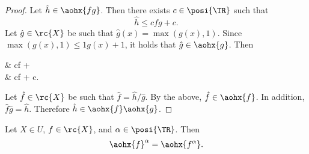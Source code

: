 \documentclass[b5paper, english, oneside]{memoir}
\begin{document}
\begin{proof}
Let $\hat{h} \in \aohx{fg}$. Then there exists $c \in \posi{\TR}$ such that
\begin{equation}
\hat{h} \leq cfg + c.
\end{equation}
Let $\hat{g} \in \rc{X}$ be such that $\hat{g}(x) = \max(g(x), 1)$. Since $\max(g(x), 1) \leq 1 g(x) + 1$, it holds that $\hat{g} \in \aohx{g}$. Then
\begin{eqs}
 & \leq cf  +  \\
{} & \leq cf + c.
\end{eqs}
Let $\hat{f} \in \rc{X}$ be such that $\hat{f} = \hat{h} / \hat{g}$. By the above, $\hat{f} \in \aohx{f}$. In addition, $\hat{f} \hat{g} = \hat{h}$. Therefore $\hat{h} \in \aohx{f} \aohx{g}$.
\end{proof}

\begin{theorem}
\label{AffinePowerHomogenuity}
Let $X \in U$, $f \in \rc{X}$, and $\alpha \in \posi{\TR}$. Then
\begin{equation}
\aohx{f}^\alpha = \aohx{f^{\alpha}}.
\end{equation}
\end{theorem}
\end{document}
